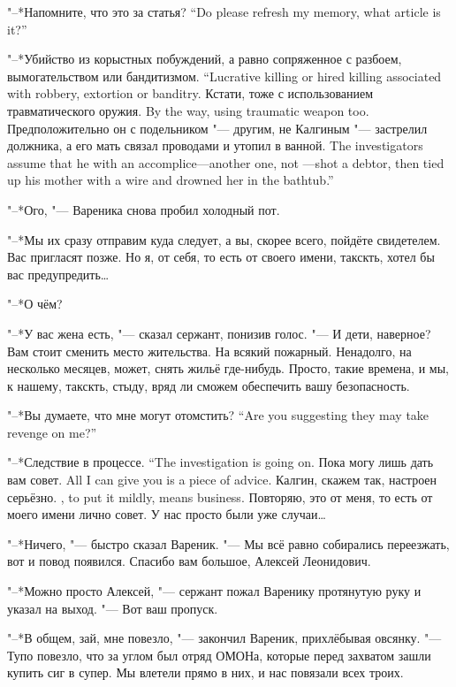 {"--*Напомните, что это за статья?}
{``Do please refresh my memory, what article is it?''}

{"--*Убийство из корыстных побуждений, а равно сопряженное с разбоем, вымогательством или бандитизмом.}
{``Lucrative killing or hired killing associated with robbery, extortion or banditry.}
{Кстати, тоже с использованием травматического оружия.}
{By the way, using traumatic weapon too.}
{Предположительно он с подельником "--- другим, не Калгиным "--- застрелил должника, а его мать связал проводами и утопил в ванной.}
{The investigators assume that he with an accomplice---another one, not \Kalgin---shot a debtor, then tied up his mother with a wire and drowned her in the bathtub.''}

"--*Ого, "--- Вареника снова пробил холодный пот.

"--*Мы их сразу отправим куда следует, а вы, скорее всего, пойдёте свидетелем.
Вас пригласят позже.
Но я, от себя, то есть от своего имени, такскть, хотел бы вас предупредить\dots{}

"--*О чём?

"--*У вас жена есть, "--- сказал сержант, понизив голос.
"--- И дети, наверное?
Вам стоит сменить место жительства.
На всякий пожарный.
Ненадолго, на несколько месяцев, может, снять жильё где-нибудь.
Просто, такие времена, и мы, к нашему, такскть, стыду, вряд ли сможем обеспечить вашу безопасность.

{"--*Вы думаете, что мне могут отомстить?}
{``Are you suggesting they may take revenge on me?''}

{"--*Следствие в процессе.}
{``The investigation is going on.}
{Пока могу лишь дать вам совет.}
{All I can give you is a piece of advice.}
{Калгин, скажем так, настроен серьёзно.}
{\Kalgin, to put it mildly, means business.}
Повторяю, это от меня, то есть от моего имени лично совет.
У нас просто были уже случаи\dots{}

"--*Ничего, "--- быстро сказал Вареник.
"--- Мы всё равно собирались переезжать, вот и повод появился.
Спасибо вам большое, Алексей Леонидович.

"--*Можно просто Алексей, "--- сержант пожал Варенику протянутую руку и указал на выход.
"--- Вот ваш пропуск.

\asterism

\textspace

"--*В общем, зай, мне повезло, "--- закончил Вареник, прихлёбывая овсянку.
"--- Тупо повезло, что за углом был отряд ОМОНа, которые перед захватом зашли купить сиг в супер.
Мы влетели прямо в них, и нас повязали всех троих.

